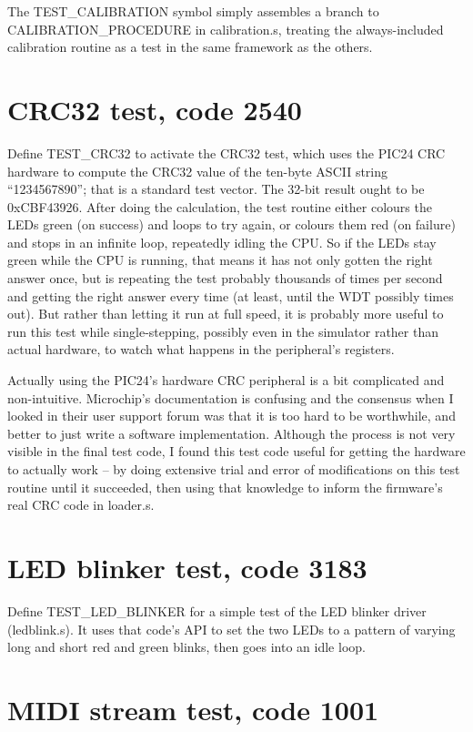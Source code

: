 The TEST\_CALIBRATION symbol simply assembles a branch to
CALIBRATION\_PROCEDURE in calibration.s, treating the always-included
calibration routine as a test in the same framework as the others.

\section{CRC32 test, code 2540}

Define TEST\_CRC32 to activate the CRC32 test, which uses the PIC24 CRC
hardware to compute the CRC32 value of the ten-byte ASCII string
``1234567890''; that is a standard test vector.  The 32-bit result ought to
be 0xCBF43926.  After doing the calculation, the test routine either colours
the LEDs green (on success) and loops to try again, or colours them red (on
failure) and stops in an infinite loop, repeatedly idling the CPU.  So if
the LEDs stay green while the CPU is running, that means it has not only
gotten the right answer once, but is repeating the test probably thousands
of times per second and getting the right answer every time (at least, until
the WDT possibly times out).  But rather than letting it run at full speed,
it is probably more useful to run this test while single-stepping, possibly
even in the simulator rather than actual hardware, to watch what happens in
the peripheral's registers.

Actually using the PIC24's hardware CRC peripheral is a bit complicated and
non-intuitive.  Microchip's documentation is confusing and the consensus
when I looked in their user support forum was that it is too hard to be
worthwhile, and better to just write a software implementation.  Although
the process is not very visible in the final test code, I found this test
code useful for getting the hardware to actually work -- by doing extensive
trial and error of modifications on this test routine until it succeeded,
then using that knowledge to inform the firmware's real CRC code in
loader.s.

\section{LED blinker test, code 3183}

Define TEST\_LED\_BLINKER for a simple test of the LED blinker driver
(ledblink.s).  It uses that code's API to set the two LEDs to a pattern of
varying long and short red and green blinks, then goes into an idle loop.

\section{MIDI stream test, code 1001}

